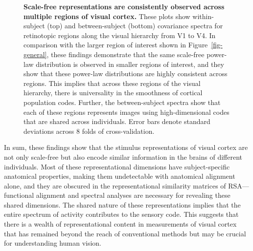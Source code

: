 \documentclass[10pt]{article}
\begin{document}
\begin{figure}


\caption{\label{fig-v1-to-v4}\textbf{Scale-free representations are
consistently observed across multiple regions of visual cortex.} These
plots show within-subject (top) and between-subject (bottom) covariance
spectra for retinotopic regions along the visual hierarchy from V1 to
V4. In comparison with the larger region of interest shown in
Figure~\ref{fig-general}, these findings demonstrate that the same
scale-free power-law distribution is observed in smaller regions of
interest, and they show that these power-law distributions are highly
consistent across regions. This implies that across these regions of the
visual hierarchy, there is universality in the smoothness of cortical
population codes. Further, the between-subject spectra show that each of
these regions represents images using high-dimensional codes that are
shared across individuals. Error bars denote standard deviations across
8 folds of cross-validation.}

\end{figure}%

In sum, these findings show that the stimulus representations of visual
cortex are not only scale-free but also encode similar information in
the brains of different individuals. Most of these representational
dimensions have subject-specific anatomical properties, making them
undetectable with anatomical alignment alone, and they are obscured in
the representational similarity matrices of RSA---functional alignment
and spectral analyses are necessary for revealing these shared
dimensions. The shared nature of these representations implies that the
entire spectrum of activity contributes to the sensory code. This
suggests that there is a wealth of representational content in
measurements of visual cortex that has remained beyond the reach of
conventional methods but may be crucial for understanding human vision.
\end{document}
